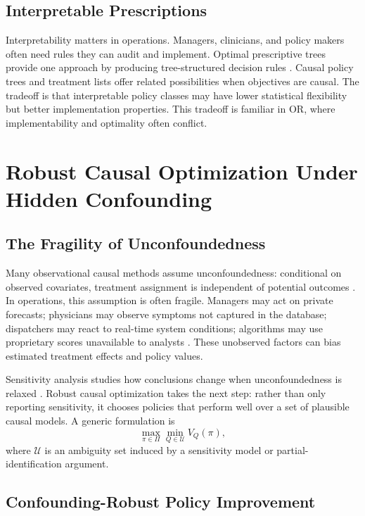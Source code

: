 \documentclass[11pt]{article}
\begin{document}
\subsection{Interpretable Prescriptions}

Interpretability matters in operations. Managers, clinicians, and policy makers often need rules they can audit and implement. Optimal prescriptive trees provide one approach by producing tree-structured decision rules \citep{bertsimas2019optimal}. Causal policy trees and treatment lists offer related possibilities when objectives are causal. The tradeoff is that interpretable policy classes may have lower statistical flexibility but better implementation properties. This tradeoff is familiar in OR, where implementability and optimality often conflict.

\section{Robust Causal Optimization Under Hidden Confounding}
\label{sec:robust}

\subsection{The Fragility of Unconfoundedness}

Many observational causal methods assume unconfoundedness: conditional on observed covariates, treatment assignment is independent of potential outcomes \citep{rosenbaum1983central,imbens2015causal}. In operations, this assumption is often fragile. Managers may act on private forecasts; physicians may observe symptoms not captured in the database; dispatchers may react to real-time system conditions; algorithms may use proprietary scores unavailable to analysts \citep{ho2017causal}. These unobserved factors can bias estimated treatment effects and policy values.

Sensitivity analysis studies how conclusions change when unconfoundedness is relaxed \citep{rosenbaum2002observational}. Robust causal optimization takes the next step: rather than only reporting sensitivity, it chooses policies that perform well over a set of plausible causal models. A generic formulation is
\[
    \max_{\pi\in\Pi}\min_{Q\in\mathcal{U}} V_Q(\pi),
\]
where $\mathcal{U}$ is an ambiguity set induced by a sensitivity model or partial-identification argument.

\subsection{Confounding-Robust Policy Improvement}
\end{document}
